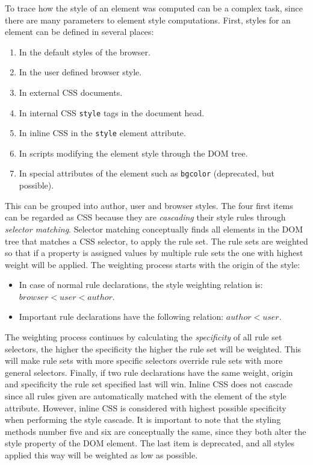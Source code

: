 \documentclass[a4paper,11pt]{kth-mag}
\newcommand{\code}[1]{\texttt{#1}}
\begin{document}
        To trace how the style of an \gls{element} was computed can be a complex task, since there are many parameters to \gls{element} style computations.
        First, styles for an \gls{element} can be defined in several places:
        \begin{enumerate}
          \item In the default styles of the \gls{browser}.
          \item In the user defined \gls{browser} style.
          \item In external \gls{CSS} documents.
          \item In internal \gls{CSS} \code{style} tags in the document head.
          \item In inline \gls{CSS} in the \code{style} \gls{element} attribute.
          \item In scripts modifying the \gls{element} style through the \gls{DOM} tree.
          \item In special attributes of the \gls{element} such as \code{bgcolor} (deprecated, but possible).
        \end{enumerate}
        This can be grouped into author, user and \gls{browser} styles.
        The four first items can be regarded as \gls{CSS} because they are \emph{cascading} their style rules through \emph{selector matching}.
        Selector matching conceptually finds all \glspl{element} in the \gls{DOM} tree that matches a \gls{CSS} selector, to apply the rule set.
        The rule sets are weighted so that if a property is assigned values by multiple rule sets the one with highest weight will be applied.
        The weighting process starts with the origin of the style:
        \begin{itemize}
          \item In case of normal rule declarations, the style weighting relation is: $browser < user < author$.
          \item Important rule declarations have the following relation: $author < user$.
        \end{itemize}
        The weighting process continues by calculating the \emph{specificity} of all rule set selectors, the higher the specificity the higher the rule set will be weighted.
        This will make rule sets with more specific selectors override rule sets with more general selectors.
        Finally, if two rule declarations have the same weight, origin and specificity the rule set specified last will win.
        Inline \gls{CSS} does not cascade since all rules given are automatically matched with the \gls{element} of the style attribute.
        However, inline \gls{CSS} is considered with highest possible specificity when performing the style cascade.
        It is important to note that the styling methods number five and six are conceptually the same, since they both alter the style property of the \gls{DOM} \gls{element}.
        The last item is deprecated, and all styles applied this way will be weighted as low as possible.
\end{document}
